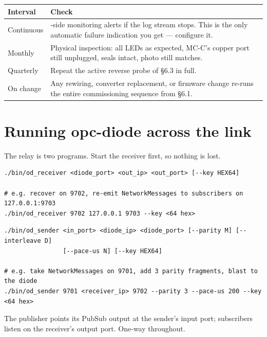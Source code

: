 \documentclass[11pt,a4paper]{article}
\begin{document}
\begin{table}[h]
\centering\small
\begin{tabularx}{\textwidth}{@{}p{26mm}X@{}}
\toprule
\textbf{Interval} & \textbf{Check} \\
\midrule
Continuous & \dstside{}-side monitoring alerts if the log stream stops. This
             is the only automatic failure indication you get --- configure it. \\
Monthly    & Physical inspection: all LEDs as expected, MC-C's copper port
             still unplugged, seals intact, photo still matches. \\
Quarterly  & Repeat the active reverse probe of \S6.3 in full. \\
On change  & Any rewiring, converter replacement, or firmware change re-runs
             the entire commissioning sequence from \S6.1. \\
\bottomrule
\end{tabularx}
\end{table}

\section{Running opc-diode across the link}
\label{sec:integrate}

The relay is two programs. Start the receiver first, so nothing is lost.

\begin{lstlisting}[style=shell,caption={DESTINATION side --- recover and re-emit to subscribers}]
./bin/od_receiver <diode_port> <out_ip> <out_port> [--key HEX64]

# e.g. recover on 9702, re-emit NetworkMessages to subscribers on 127.0.0.1:9703
./bin/od_receiver 9702 127.0.0.1 9703 --key <64 hex>
\end{lstlisting}

\begin{lstlisting}[style=shell,caption={SOURCE side --- take the publisher's output, protect, transmit}]
./bin/od_sender <in_port> <diode_ip> <diode_port> [--parity M] [--interleave D]
                [--pace-us N] [--key HEX64]

# e.g. take NetworkMessages on 9701, add 3 parity fragments, blast to the diode
./bin/od_sender 9701 <receiver_ip> 9702 --parity 3 --pace-us 200 --key <64 hex>
\end{lstlisting}

The publisher points its PubSub output at the sender's input port; subscribers
listen on the receiver's output port. One-way throughout.
\end{document}
